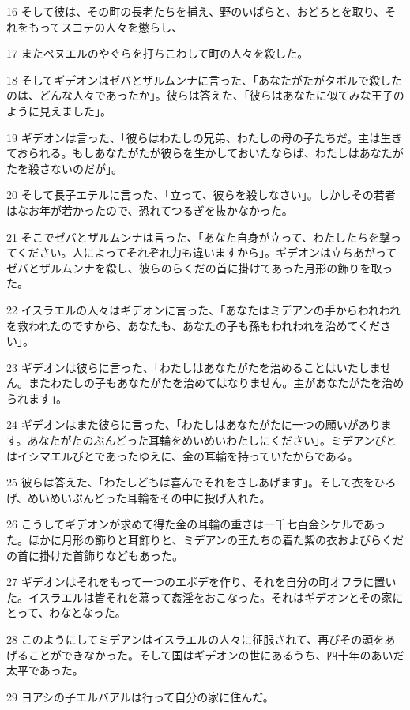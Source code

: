 \par 16 そして彼は、その町の長老たちを捕え、野のいばらと、おどろとを取り、それをもってスコテの人々を懲らし、
\par 17 またペヌエルのやぐらを打ちこわして町の人々を殺した。
\par 18 そしてギデオンはゼバとザルムンナに言った、「あなたがたがタボルで殺したのは、どんな人々であったか」。彼らは答えた、「彼らはあなたに似てみな王子のように見えました」。
\par 19 ギデオンは言った、「彼らはわたしの兄弟、わたしの母の子たちだ。主は生きておられる。もしあなたがたが彼らを生かしておいたならば、わたしはあなたがたを殺さないのだが」。
\par 20 そして長子エテルに言った、「立って、彼らを殺しなさい」。しかしその若者はなお年が若かったので、恐れてつるぎを抜かなかった。
\par 21 そこでゼバとザルムンナは言った、「あなた自身が立って、わたしたちを撃ってください。人によってそれぞれ力も違いますから」。ギデオンは立ちあがってゼバとザルムンナを殺し、彼らのらくだの首に掛けてあった月形の飾りを取った。
\par 22 イスラエルの人々はギデオンに言った、「あなたはミデアンの手からわれわれを救われたのですから、あなたも、あなたの子も孫もわれわれを治めてください」。
\par 23 ギデオンは彼らに言った、「わたしはあなたがたを治めることはいたしません。またわたしの子もあなたがたを治めてはなりません。主があなたがたを治められます」。
\par 24 ギデオンはまた彼らに言った、「わたしはあなたがたに一つの願いがあります。あなたがたのぶんどった耳輪をめいめいわたしにください」。ミデアンびとはイシマエルびとであったゆえに、金の耳輪を持っていたからである。
\par 25 彼らは答えた、「わたしどもは喜んでそれをさしあげます」。そして衣をひろげ、めいめいぶんどった耳輪をその中に投げ入れた。
\par 26 こうしてギデオンが求めて得た金の耳輪の重さは一千七百金シケルであった。ほかに月形の飾りと耳飾りと、ミデアンの王たちの着た紫の衣およびらくだの首に掛けた首飾りなどもあった。
\par 27 ギデオンはそれをもって一つのエポデを作り、それを自分の町オフラに置いた。イスラエルは皆それを慕って姦淫をおこなった。それはギデオンとその家にとって、わなとなった。
\par 28 このようにしてミデアンはイスラエルの人々に征服されて、再びその頭をあげることができなかった。そして国はギデオンの世にあるうち、四十年のあいだ太平であった。
\par 29 ヨアシの子エルバアルは行って自分の家に住んだ。
